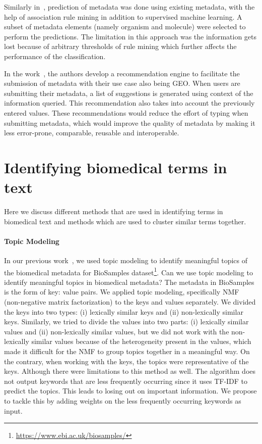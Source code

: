 Similarly in~\cite{panahiazar2017predicting}, prediction of metadata was done using existing metadata, with the help of association rule mining in addition to supervised machine learning. A subset of metadata elements (namely organism and molecule) were selected to perform the predictions. The limitation in this approach was the information gets lost because of arbitrary thresholds of rule mining which further affects the performance of the classification. 

In the work~\cite{panahiazar2015context}, the authors develop a recommendation engine to facilitate the submission of metadata with their use case also being GEO. When users are submitting their metadata, a list of suggestions is generated using context of the information queried. This recommendation also takes into account the previously entered values. These recommendations would reduce the effort of typing when submitting metadata, which would improve the quality of metadata by making it less error-prone, comparable, reusable and interoperable. 

\section{Identifying biomedical terms in text}
Here we discuss different methods that are used in identifying terms in biomedical text and methods which are used to cluster similar terms together. 

\paragraph{Topic Modeling}
In our previous work~\cite{nayak2018quality}, we used topic modeling to identify meaningful topics of the biomedical metadata for BioSamples dataset\footnote{\url{https://www.ebi.ac.uk/biosamples/}}. Can we use topic modeling to identify meaningful topics in biomedical metadata? The metadata in BioSamples is the form of key: value pairs. We applied topic modeling, specifically NMF~\cite{lee1999learning} (non-negative matrix factorization) to the keys and values separately. We divided the keys into two types: (i) lexically similar keys and (ii) non-lexically similar keys. Similarly, we tried to divide the values into two parts: (i) lexically similar values and (ii) non-lexically similar values, but we did not work with the non-lexically similar values because of the heterogeneity present in the values, which made it difficult for the NMF to group topics together in a meaningful way. On the contrary, when working with the keys, the topics were representative of the keys. Although there were limitations to this method as well. The algorithm does not output keywords that are less frequently occurring since it uses TF-IDF to predict the topics. This leads to losing out on important information. We propose to tackle this by adding weights on the less frequently occurring keywords as input. 

